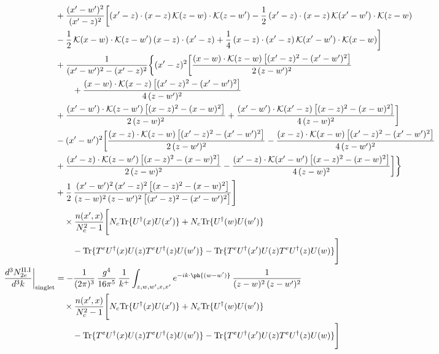 \begin{align}
&+\frac{(x^{\prime}-w^{\prime})^{2}}{(x^{\prime}-z)^{2}}\bigg[(x^{\prime}-z)\cdot(x-z)\,\mathcal{K}(z-w)\cdot\mathcal{K}(z-w^{\prime})-\frac{1}{2}\,(x^{\prime}-z)\cdot(x-z)\,\mathcal{K}(x^{\prime}-w^{\prime})\cdot\mathcal{K}(z-w)\notag \\ & -\frac{1}{2}\,\mathcal{K}(x-w)\cdot\mathcal{K}(z-w^{\prime})\,(x-z)\cdot(x^{\prime}-z)+\frac{1}{4}\,(x-z)\cdot(x^{\prime}-z)\,\mathcal{K}(x^{\prime}-w^{\prime})\cdot\mathcal{K}(x-w)\bigg]\notag\\
&+\frac{1}{(x^{\prime}-w^{\prime})^{2}-(x^{\prime}-z)^{2}}\bigg\{(x^{\prime}-z)^{2}\bigg[\frac{(x-w)\cdot\mathcal{K}(z-w)\,\big[(x^{\prime}-z)^{2}-(x^{\prime}-w^{\prime})^{2}\big]}{2\,(z-w^{\prime})^{2}}\notag\\ &\qquad+\frac{(x-w)\cdot\mathcal{K}(x-z)\,\big[(x^{\prime}-z)^{2}-(x^{\prime}-w^{\prime})^{2}\big]}{4\,(z-w^{\prime})^{2}}\notag \\ & +\frac{(x^{\prime}-w^{\prime})\cdot\mathcal{K}(z-w^{\prime})\,\big[(x-z)^{2}-(x-w)^{2}\big]}{2\,(z-w)^{2}}+\frac{(x^{\prime}-w^{\prime})\cdot\mathcal{K}(x^{\prime}-z)\,\big[(x-z)^{2}-(x-w)^{2}\big]}{4\,(z-w)^{2}}\bigg]\notag\\
&-(x^{\prime}-w^{\prime})^{2}\bigg[\frac{(x-z)\cdot\mathcal{K}(z-w)\,\big[(x^{\prime}-z)^{2}-(x^{\prime}-w^{\prime})^{2}\big]}{2\,(z-w^{\prime})^{2}}-\frac{(x-z)\cdot\mathcal{K}(x-w)\,\big[(x^{\prime}-z)^{2}-(x^{\prime}-w^{\prime})^{2}\big]}{4\,(z-w^{\prime})^{2}}\notag \\ & +\frac{(x^{\prime}-z)\cdot\mathcal{K}(z-w^{\prime})\,\big[(x-z)^{2}-(x-w)^{2}\big]}{2\,(z-w)^{2}}-\frac{(x^{\prime}-z)\cdot\mathcal{K}(x^{\prime}-w^{\prime})\,\big[(x-z)^{2}-(x-w)^{2}\big]}{4\,(z-w)^{2}}\bigg]\bigg\}\notag\\
&+\frac{1}{2}\,\frac{(x^{\prime}-w^{\prime})^{2}\,(x^{\prime}-z)^{2}\,\big[(x-z)^{2}-(x-w)^{2}\big]}{(z-w)^{2}\,(z-w^{\prime})^{2}\,\big[(x^{\prime}-z)^{2}-(x^{\prime}-w^{\prime})^{2}\big]}\Bigg]\notag\\ &\quad\times\frac{n(x',x)}{N_{c}^{2}-1}\Bigg[N_{c}{\rm Tr}\{U^{\dagger}(x)U(x')\}+N_{c}{\rm Tr}\{U^{\dagger}(w)U(w')\}\notag\\ &\qquad-{\rm Tr}\{T^{e}U^{\dagger}(x)U(z)T^{e}U^{\dagger}(z)U(w')\}-{\rm Tr}\{T^{e}U^{\dagger}(x')U(z)T^{e}U^{\dagger}(z)U(w)\}\Bigg]\\
\frac{d^{3}N^{\rm II.I}_{2e}}{d^{3}k}\bigg|_{\rm singlet}&= -\frac{1}{(2\pi)^{3}}\,\frac{g^{4}}{16\pi^{5}}\,\frac{1}{k^{+}}\int_{z,w,w^{\prime},x,x^{\prime}}e^{-ik\cdot\ph{(w-w^{\prime})}}\,\frac{1}{(z-w)^{2}\,(z-w^{\prime})^{2}}\notag\\ &\quad\times\frac{n(x',x)}{N_{c}^{2}-1}\Bigg[N_{c}{\rm Tr}\{U^{\dagger}(x)U(x')\}+N_{c}{\rm Tr}\{U^{\dagger}(w)U(w')\}\notag\\ &\qquad-{\rm Tr}\{T^{e}U^{\dagger}(x)U(z)T^{e}U^{\dagger}(z)U(w')\}-{\rm Tr}\{T^{e}U^{\dagger}(x')U(z)T^{e}U^{\dagger}(z)U(w)\}\Bigg]\notag
\end{align}

